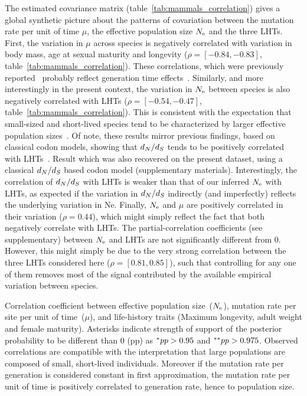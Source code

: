 The estimated covariance matrix (table~\ref{tab:mammals_correlation}) gives a global synthetic picture about the patterns of covariation between the mutation rate per unit of time $\mu$, the {effective population size} $N_{\text{e}}$ and the three {LHT}s.
First, the variation in $\mu$ across species is negatively correlated with variation in body mass, age at sexual maturity and longevity ($\rho=[-0.84, -0.83]$, table~\ref{tab:mammals_correlation}).
These correlations, which were previously reported~\citep{Lartillot2012,Nabholz2013} probably reflect generation time effects~\citep{Lanfear2010, Gao2016}.
Similarly, and more interestingly in the present context, the variation in $N_{\text{e}}$ between species is also negatively correlated with {LHT}s ($\rho=[-0.54, -0.47]$, table~\ref{tab:mammals_correlation}).
This is consistent with the expectation that small-sized and short-lived species tend to be characterized by larger effective population sizes~\citep{Romiguier2014}.
Of note, these results mirror previous findings, based on classical {codon} models, showing that $d_N / d_S$ tends to be positively correlated with {LHT}s~\citep{Lartillot2012,Nabholz2013,Figuet2017}.
Result which was also recovered on the present dataset, using a classical $d_N / d_S$ based codon model (supplementary materials).
Interestingly, the correlation of $d_N / d_S$ with LHTs is weaker than that of our inferred $N_{\text{e}}$ with LHTs, as expected if the variation in $d_N / d_S$ indirectly (and imperfectly) reflects the underlying variation in Ne.
Finally, $N_{\text{e}}$ and $\mu$ are positively correlated in their variation ($\rho = 0.44$), which might simply reflect the fact that both negatively correlate with {LHT}s.
The partial-correlation coefficients (see supplementary) between $N_{\text{e}}$ and {LHT}s are not significantly different from 0.
However, this might simply be due to the very strong correlation between the three {LHT}s considered here ($\rho=[0.81, 0.85]$), such that controlling for any one of them removes most of the signal contributed by the available empirical variation between species.

\begin{table*}[t]
    
    \caption[Traits correlation in mammals]{
        Correlation coefficient between effective population size~($N_{\text{e}}$), mutation rate per site per unit of time~($\mu$), and life-history traits (Maximum longevity, adult weight and female maturity).
        Asterisks indicate strength of support of the {posterior} probability to be different than $0$ (pp) as $\smash{^{*}} pp > 0.95$ and $\smash{^{**}} pp > 0.975$.
        Observed correlations are compatible with the interpretation that large populations are composed of small, short-lived individuals.
        Moreover if the mutation rate per generation is considered constant in first approximation, the mutation rate per unit of time is positively correlated to generation rate, hence to population size.
    }
    \label{tab:mammals_correlation}
\end{table*}

